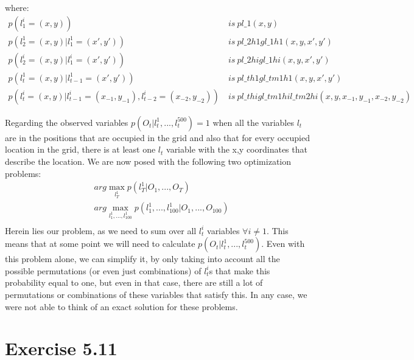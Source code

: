\documentclass[11pt,a4paper,oneside]{report}
\begin{document}
where:\\
\begin{align*}
p(l_1^i=(x,y))&\ is\ pl\_1(x,y)\\
p(l_2^1=(x,y)|l_1^1=(x',y'))&\ is\ pl\_2h1gl\_1h1(x,y,x',y')\\
p(l_2^i=(x,y)|l_1^i=(x',y'))&\ is\ pl\_2higl\_1hi(x,y,x',y')\\
p(l_t^1=(x,y)|l_{t-1}^1=(x',y'))&\ is\ pl\_th1gl\_tm1h1(x,y,x',y')\\
p(l_t^i=(x,y)|l_{t-1}^i=(x_{-1},y_{-1}),l_{t-2}^i=(x_{-2},y_{-2}))&\ is\ pl\_thigl\_tm1hil\_tm2hi(x,y,x_{-1},y_{-1},x_{-2},y_{-2})
\end{align*}

Regarding the observed variables $p(O_t|l_t^1,...,l_t^{500})=1$ when all the variables $l_t$ are in the positions that are occupied in the grid and also that for every occupied location in the grid, there is at least one $l_t$ variable with the x,y coordinates that describe the location. We are now posed with the following two optimization problems:
\begin{align*}
&arg\max_{l_T^1}p(l_T^1 | O_1,...,O_T)\\
&arg\max_{l_1^1,...,l_{100}^1}p(l_1^1,...,l_{100}^1 | O_1,...,O_{100})\\
\end{align*}
Herein lies our problem, as we need to sum over all $l_t^i$ variables $\forall i \neq 1$. This means that at some point we will need to calculate $p(O_t|l_t^1,...,l_t^{500})$. Even with this problem alone, we can simplify it, by only taking into account all the possible permutations (or even just combinations) of $l_t^i$s that make this probability equal to one, but even in that case, there are still a lot of permutations or combinations of these variables that satisfy this. In any case, we were not able to think of an exact solution for these problems. 

\section*{Exercise 5.11}	
\end{document}
